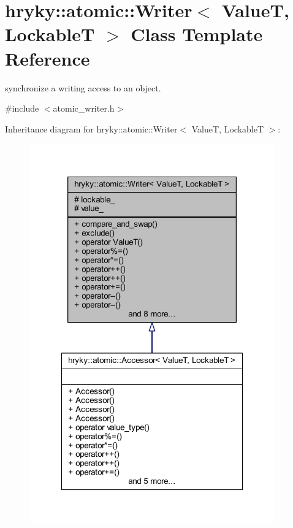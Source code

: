 \hypertarget{classhryky_1_1atomic_1_1_writer}{\section{hryky\-:\-:atomic\-:\-:Writer$<$ Value\-T, Lockable\-T $>$ Class Template Reference}
\label{classhryky_1_1atomic_1_1_writer}
}


synchronize a writing access to an object.  




{\ttfamily \#include $<$atomic\-\_\-writer.\-h$>$}



Inheritance diagram for hryky\-:\-:atomic\-:\-:Writer$<$ Value\-T, Lockable\-T $>$\-:
\nopagebreak
\begin{figure}[H]
\begin{center}
\leavevmode
\includegraphics[width=300pt]{classhryky_1_1atomic_1_1_writer__inherit__graph}
\end{center}
\end{figure}
